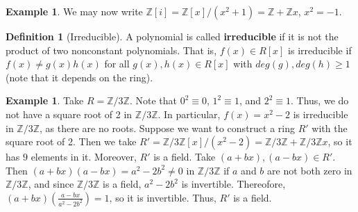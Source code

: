 \documentclass[12pt]{article}
\theoremstyle{definition}
\newtheorem{defn}[thm]{Definition}
\newtheorem{eg}[thm]{Example}
\theoremstyle{remark}
\numberwithin{equation}{section}
\newcommand\Z{\mathbb Z}    %
\newcommand\B[1]{\textbf{ #1}}
\begin{document}
\vspace{15pt}


\begin{eg}
        We may now write $\Z[i] = \Z[x]/(x^2+1) = \Z + \Z x$, $x^2 = -1$.
\end{eg}


\vspace{15pt}

\begin{defn}[Irreducible]
        A polynomial is called \B{irreducible} if it is not the product of two nonconstant polynomials. That is, $f(x) \in R[x]$ is irreducible if $f(x) \neq g(x)h(x)$ for all $g(x),h(x) \in R[x]$ with $deg(g),deg(h) \geq 1$ (note that it depends on the ring).
\end{defn}


\vspace{15pt}

\begin{eg}
        Take $R = \Z/3\Z$. Note that $0^2 \equiv 0$, $1^2 \equiv 1$, and $2^2 \equiv 1$. Thus, we do not have a square root of 2 in $\Z/3\Z$. In particular, $f(x) = x^2 - 2$ is irreducible in $\Z/3\Z$, as there are no roots. Suppose we want to construct a ring $R'$ with the square root of 2. Then we take $R' = \Z/3\Z[x]/(x^2-2) = \Z/3\Z + \Z/3\Z x$, so it has $9$ elements in it. Moreover, $R'$ is a field. Take $(a+bx),(a-bx) \in R'$. Then $(a+bx)(a-bx) = a^2 - 2b^2 \neq 0$ in $\Z/3\Z$ if $a$ and $b$ are not both zero in $\Z/3\Z$, and since $\Z/3\Z$ is a field, $a^2 - 2b^2$ is invertible. Thereofore, $(a+bx)\left(\frac{a-bx}{a^2-2b^2}\right) = 1$, so it is invertible. Thus, $R'$ is a field.
\end{eg}

\vspace{15pt}
\end{document}
